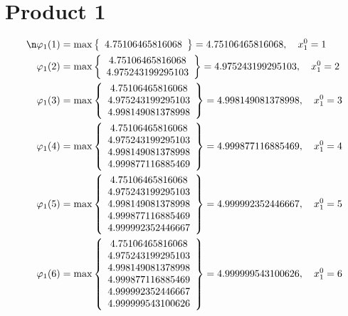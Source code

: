 \documentclass{article}
\begin{document}
\section{Product 1}
\begin{align*}
\n  
  
\varphi_{1}(1) &= \max \left\{ \begin{array}{c}
4.75106465816068
\end{array} \right\} = 4.75106465816068, \quad x_{1}^0 = 1\\
  
  
  
  
\varphi_{1}(2) &= \max \left\{ \begin{array}{c}
4.75106465816068 \\
 4.975243199295103
\end{array} \right\} = 4.975243199295103, \quad x_{1}^0 = 2\\
  
  
  
  
\varphi_{1}(3) &= \max \left\{ \begin{array}{c}
4.75106465816068 \\
 4.975243199295103 \\
 4.998149081378998
\end{array} \right\} = 4.998149081378998, \quad x_{1}^0 = 3\\
  
  
  
  
\varphi_{1}(4) &= \max \left\{ \begin{array}{c}
4.75106465816068 \\
 4.975243199295103 \\
 4.998149081378998 \\
 4.999877116885469
\end{array} \right\} = 4.999877116885469, \quad x_{1}^0 = 4\\
  
  
  
  
\varphi_{1}(5) &= \max \left\{ \begin{array}{c}
4.75106465816068 \\
 4.975243199295103 \\
 4.998149081378998 \\
 4.999877116885469 \\
 4.999992352446667
\end{array} \right\} = 4.999992352446667, \quad x_{1}^0 = 5\\
  
  
  
  
\varphi_{1}(6) &= \max \left\{ \begin{array}{c}
4.75106465816068 \\
 4.975243199295103 \\
 4.998149081378998 \\
 4.999877116885469 \\
 4.999992352446667 \\
 4.999999543100626
\end{array} \right\} = 4.999999543100626, \quad x_{1}^0 = 6\\
  

\end{align*}
\end{document}
